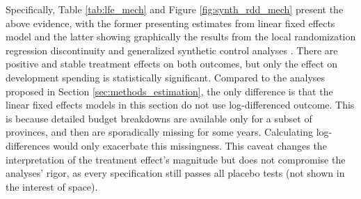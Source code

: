 \documentclass[12pt]{article}
\newcommand{\1}{\mathbbm{1}}
\begin{document}
Specifically, Table \ref{tab:lfe_mech} and Figure \ref{fig:synth_rdd_mech} present the above evidence, with the former presenting estimates from linear fixed effects model and the latter showing graphically the results from the local randomization regression discontinuity \citep{CattaneoTitiunik2015} and generalized synthetic control analyses \citep{Xu2017gsynth}. There are positive and stable treatment effects on both outcomes, but only the effect on development spending is statistically significant. Compared to the analyses proposed in Section \ref{sec:methods_estimation}, the only difference is that the linear fixed effects models in this section do not use log-differenced outcome. This is because detailed budget breakdowns are available only for a subset of provinces, and then are sporadically missing for some years. Calculating log-differences would only exacerbate this missingness. This caveat changes the interpretation of the treatment effect's magnitude but does not compromise the analyses' rigor, as every specification still passes all placebo tests (not shown in the interest of space).
\end{document}
